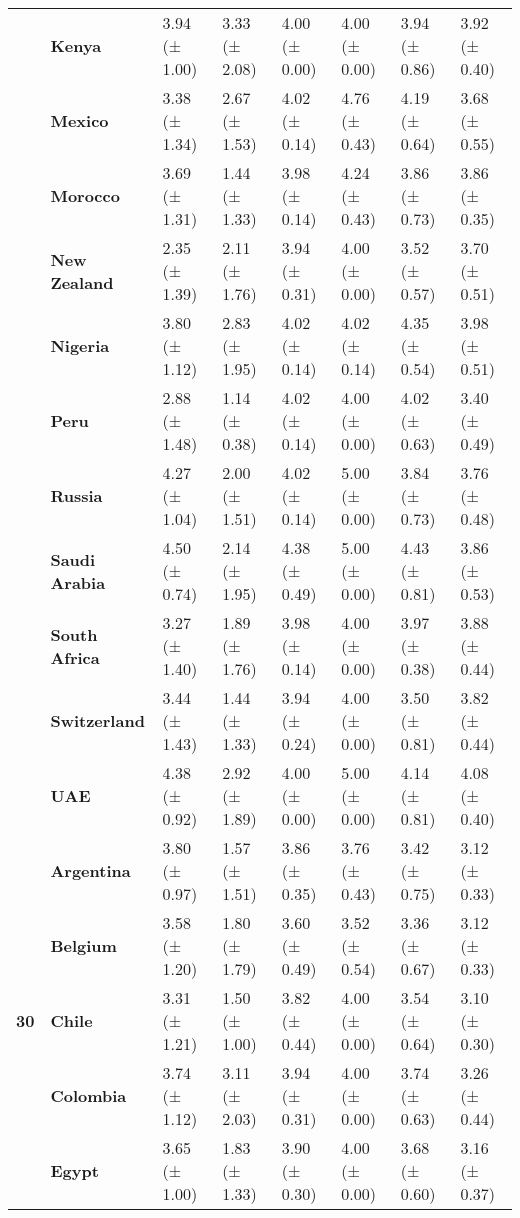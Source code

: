 \begin{longtable}{llllllll}
\textbf{} & \textbf{Kenya} & 3.94 (± 1.00) & 3.33 (± 2.08) & 4.00 (± 0.00) & 4.00 (± 0.00) & 3.94 (± 0.86) & 3.92 (± 0.40) \\
\textbf{} & \textbf{Mexico} & 3.38 (± 1.34) & 2.67 (± 1.53) & 4.02 (± 0.14) & 4.76 (± 0.43) & 4.19 (± 0.64) & 3.68 (± 0.55) \\
\textbf{} & \textbf{Morocco} & 3.69 (± 1.31) & 1.44 (± 1.33) & 3.98 (± 0.14) & 4.24 (± 0.43) & 3.86 (± 0.73) & 3.86 (± 0.35) \\
\textbf{} & \textbf{New Zealand} & 2.35 (± 1.39) & 2.11 (± 1.76) & 3.94 (± 0.31) & 4.00 (± 0.00) & 3.52 (± 0.57) & 3.70 (± 0.51) \\
\textbf{} & \textbf{Nigeria} & 3.80 (± 1.12) & 2.83 (± 1.95) & 4.02 (± 0.14) & 4.02 (± 0.14) & 4.35 (± 0.54) & 3.98 (± 0.51) \\
\textbf{} & \textbf{Peru} & 2.88 (± 1.48) & 1.14 (± 0.38) & 4.02 (± 0.14) & 4.00 (± 0.00) & 4.02 (± 0.63) & 3.40 (± 0.49) \\
\textbf{} & \textbf{Russia} & 4.27 (± 1.04) & 2.00 (± 1.51) & 4.02 (± 0.14) & 5.00 (± 0.00) & 3.84 (± 0.73) & 3.76 (± 0.48) \\
\textbf{} & \textbf{Saudi Arabia} & 4.50 (± 0.74) & 2.14 (± 1.95) & 4.38 (± 0.49) & 5.00 (± 0.00) & 4.43 (± 0.81) & 3.86 (± 0.53) \\
\textbf{} & \textbf{South Africa} & 3.27 (± 1.40) & 1.89 (± 1.76) & 3.98 (± 0.14) & 4.00 (± 0.00) & 3.97 (± 0.38) & 3.88 (± 0.44) \\
\textbf{} & \textbf{Switzerland} & 3.44 (± 1.43) & 1.44 (± 1.33) & 3.94 (± 0.24) & 4.00 (± 0.00) & 3.50 (± 0.81) & 3.82 (± 0.44) \\
\textbf{} & \textbf{UAE} & 4.38 (± 0.92) & 2.92 (± 1.89) & 4.00 (± 0.00) & 5.00 (± 0.00) & 4.14 (± 0.81) & 4.08 (± 0.40) \\
\cline{1-8}
\multirow[t]{19}{*}{\textbf{30}} & \textbf{Argentina} & 3.80 (± 0.97) & 1.57 (± 1.51) & 3.86 (± 0.35) & 3.76 (± 0.43) & 3.42 (± 0.75) & 3.12 (± 0.33) \\
\textbf{} & \textbf{Belgium} & 3.58 (± 1.20) & 1.80 (± 1.79) & 3.60 (± 0.49) & 3.52 (± 0.54) & 3.36 (± 0.67) & 3.12 (± 0.33) \\
\textbf{} & \textbf{Chile} & 3.31 (± 1.21) & 1.50 (± 1.00) & 3.82 (± 0.44) & 4.00 (± 0.00) & 3.54 (± 0.64) & 3.10 (± 0.30) \\
\textbf{} & \textbf{Colombia} & 3.74 (± 1.12) & 3.11 (± 2.03) & 3.94 (± 0.31) & 4.00 (± 0.00) & 3.74 (± 0.63) & 3.26 (± 0.44) \\
\textbf{} & \textbf{Egypt} & 3.65 (± 1.00) & 1.83 (± 1.33) & 3.90 (± 0.30) & 4.00 (± 0.00) & 3.68 (± 0.60) & 3.16 (± 0.37) \\

\end{longtable}
